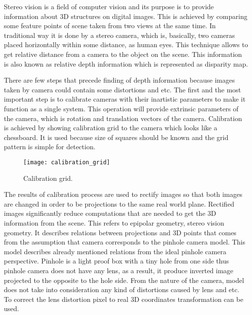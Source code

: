 \documentclass[../../../../main]{subfiles}
\begin{document}
Stereo vision is a field of computer vision and its purpose is to provide information about 3D structures on digital images. This is achieved by comparing some feature points of scene taken from two views at the same time. In traditional way it is done by a stereo camera, which is, basically, two cameras placed horizontally within some distance, as human eyes. This technique allows to get relative distance from a camera to the object on the scene. This information is also known as relative depth information which is represented as disparity map.

There are few steps that precede finding of depth information because images taken by camera could contain some distortions and etc. The first and the most important step is to calibrate cameras with their inartistic parameters to make it function as a single system. This operation will provide extrinsic parameters of the camera, which is rotation and translation vectors of the camera. Calibration is achieved by showing calibration grid to the camera which looks like a chessboard. It is used because size of squares should be known and the grid pattern is simple for detection.

\begin{figure} [ht]
    \begin{center}
        \texttt{[image: calibration\_grid]}
        \caption{Calibration grid.}
        \label{fig:calibrationGrid}
    \end{center}
\end{figure}

The results of calibration process are used to rectify images so that both images are changed in order to be projections to the same real world plane. Rectified images significantly reduce computations that are needed to get the 3D information from the scene. This refers to epipolar geometry, stereo vision geometry. It describes relations between projections and 3D points that comes from the assumption that camera corresponds to the pinhole camera model. This model describes already mentioned relations from the ideal pinhole camera perspective. Pinhole is a light proof box with a tiny hole from one side thus pinhole camera does not have any lens, as a result, it produce inverted image projected to the opposite to the hole side. From the nature of the camera, model does not take into consideration any kind of distortions caused by lens and etc. To correct the lens distortion pixel to real 3D coordinates transformation can be used.
\end{document}
